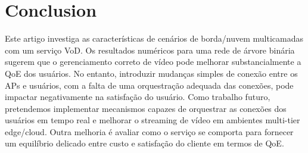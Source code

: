 \section{Conclusion}
\label{sec:conclusion}

Este artigo investiga as características de cenários de borda/nuvem multicamadas com um serviço VoD. Os resultados numéricos para uma rede de árvore binária sugerem que o gerenciamento correto de vídeo pode melhorar substancialmente a QoE dos usuários. No entanto, introduzir mudanças simples de conexão entre os APs e usuários, com a falta de uma orquestração adequada das conexões, pode impactar negativamente na satisfação do usuário. Como trabalho futuro, pretendemos implementar mecanismos capazes de orquestrar as conexões dos usuários em tempo real e melhorar o streaming de vídeo em ambientes multi-tier edge/cloud. Outra melhoria é avaliar como o serviço se comporta para fornecer um equilíbrio delicado entre custo e satisfação do cliente em termos de QoE.